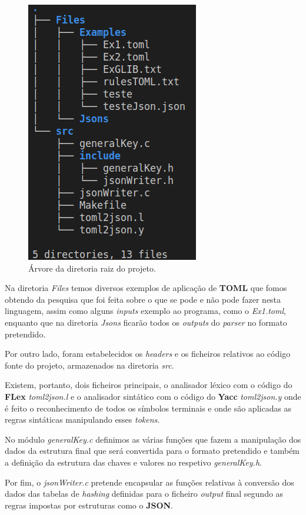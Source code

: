 \documentclass[a4paper,12pt]{report}
\begin{document}
\begin{figure}[h!]
    \centering
    \includegraphics[scale=0.4]{images/Project-Tree-Folders.png}
    \caption{Árvore da diretoria raiz do projeto.                              }
    \label{fig:my_label}
\end{figure}

Na diretoria \textit{Files} temos diversos exemplos de aplicação de \textbf{TOML} que fomos obtendo da pesquisa que foi feita sobre o que se pode e não pode fazer nesta linguagem, assim como alguns \textit{inputs} exemplo ao programa, como o \textit{Ex1.toml}, enquanto que na diretoria \textit{Jsons} ficarão todos os \textit{outputs} do \textit{parser} no formato pretendido.
\par
Por outro lado, foram estabelecidos os \textit{headers} e os ficheiros relativos ao código fonte do projeto, armazenados na diretoria \textit{src}.
\par
Existem, portanto, dois ficheiros principais, o analisador léxico com o código do \textbf{FLex} \textit{toml2json.l} e o analisador sintático com o código do \textbf{Yacc} \textit{toml2json.y} onde é feito o reconhecimento de todos os símbolos terminais e onde são aplicadas as regras sintáticas manipulando esses \textit{tokens}.
\par
No módulo \textit{generalKey.c} definimos as várias funções que fazem a manipulação dos dados da estrutura final que será convertida para o formato pretendido e também a definição da estrutura das chaves e valores no respetivo \textit{generalKey.h}.
\par
Por fim, o \textit{jsonWriter.c} pretende encapsular as funções relativas à conversão dos dados das tabelas de \textit{hashing} definidas para o ficheiro \textit{output} final segundo as regras impostas por estruturas como o \textbf{JSON}.
\end{document}
